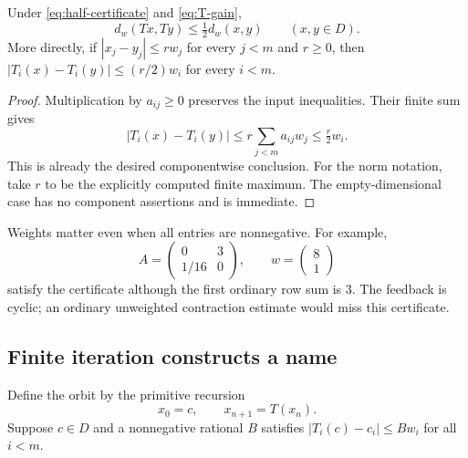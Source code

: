 \begin{lemma}\label{lem:weighted-contraction}
Under \eqref{eq:half-certificate} and \eqref{eq:T-gain},
\[
 d_w(Tx,Ty)\leq\tfrac12 d_w(x,y)\qquad(x,y\in D).
\]
More directly, if $|x_j-y_j|\leq r w_j$ for every $j<m$ and $r\geq0$,
then $|T_i(x)-T_i(y)|\leq(r/2)w_i$ for every $i<m$.
\end{lemma}
\begin{proof}
Multiplication by $a_{ij}\geq0$ preserves the input inequalities. Their finite
sum gives
\[
 |T_i(x)-T_i(y)|\leq r\sum_{j<m}a_{ij}w_j\leq\tfrac r2 w_i.
\]
This is already the desired componentwise conclusion. For the norm notation,
take $r$ to be the explicitly computed finite maximum. The empty-dimensional
case has no component assertions and is immediate.
\end{proof}

Weights matter even when all entries are nonnegative. For example,
\[
 A=\begin{pmatrix}0&3\\1/16&0\end{pmatrix},\qquad
 w=\begin{pmatrix}8\\1\end{pmatrix}
\]
satisfy the certificate although the first ordinary row sum is $3$.
The feedback is cyclic; an ordinary unweighted contraction estimate would
miss this certificate.

\subsection{Finite iteration constructs a name}

Define the orbit by the primitive recursion
\[
 x_0=c,\qquad x_{n+1}=T(x_n).
\]
Suppose $c\in D$ and a nonnegative rational $B$ satisfies
$|T_i(c)-c_i|\leq Bw_i$ for all $i<m$.

